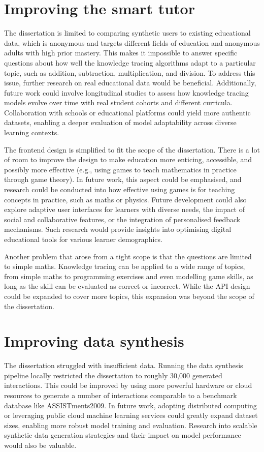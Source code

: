 \section{Improving the smart tutor}

The dissertation is limited to comparing synthetic users to existing educational data, which is anonymous and targets different fields of education and anonymous adults with high prior mastery. This makes it impossible to answer specific questions about how well the knowledge tracing algorithms adapt to a particular topic, such as addition, subtraction, multiplication, and division. To address this issue, further research on real educational data would be beneficial. Additionally, future work could involve longitudinal studies to assess how knowledge tracing models evolve over time with real student cohorts and different curricula. Collaboration with schools or educational platforms could yield more authentic datasets, enabling a deeper evaluation of model adaptability across diverse learning contexts.

The frontend design is simplified to fit the scope of the dissertation. There is a lot of room to improve the design to make education more enticing, accessible, and possibly more effective (e.g., using games to teach mathematics in practice through game theory). In future work, this aspect could be emphasised, and research could be conducted into how effective using games is for teaching concepts in practice, such as maths or physics. Future development could also explore adaptive user interfaces for learners with diverse needs, the impact of social and collaborative features, or the integration of personalised feedback mechanisms. Such research would provide insights into optimising digital educational tools for various learner demographics.

Another problem that arose from a tight scope is that the questions are limited to simple maths. Knowledge tracing can be applied to a wide range of topics, from simple maths to programming exercises and even modelling game skills, as long as the skill can be evaluated as correct or incorrect. While the API design could be expanded to cover more topics, this expansion was beyond the scope of the dissertation.

\section{Improving data synthesis}

The dissertation struggled with insufficient data. Running the data synthesis pipeline locally restricted the dissertation to roughly 30{,}000 generated interactions. This could be improved by using more powerful hardware or cloud resources to generate a number of interactions comparable to a benchmark database like ASSISTments2009. In future work, adopting distributed computing or leveraging public cloud machine learning services could greatly expand dataset sizes, enabling more robust model training and evaluation. Research into scalable synthetic data generation strategies and their impact on model performance would also be valuable.

